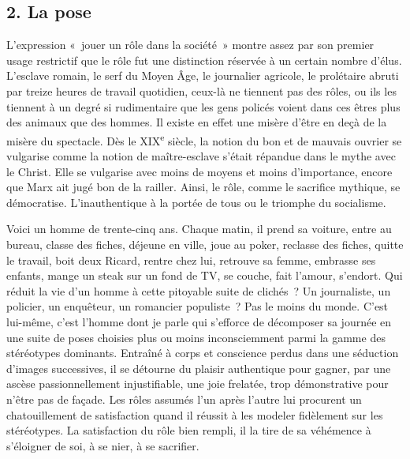 \documentclass[french,twoside]{book} %
\begin{document}
\subsection[{2. La pose}]{\textsc{2.} La pose}
\noindent L’expression « jouer un rôle dans la société » montre assez par son premier usage restrictif que le rôle fut une distinction réservée à un certain nombre d’élus. L’esclave romain, le serf du Moyen Âge, le journalier agricole, le prolétaire abruti par treize heures de travail quotidien, ceux-là ne tiennent pas des rôles, ou ils les tiennent à un degré si rudimentaire que les gens policés voient dans ces êtres plus des animaux que des hommes. Il existe en effet une misère d’être en deçà de la misère du spectacle. Dès le XIX\textsuperscript{e} siècle, la notion du bon et de mauvais ouvrier se vulgarise comme la notion de maître-esclave s’était répandue dans le mythe avec le Christ. Elle se vulgarise avec moins de moyens et moins d’importance, encore que Marx ait jugé bon de la railler. Ainsi, le rôle, comme le sacrifice mythique, se démocratise. L’inauthentique à la portée de tous ou le triomphe du socialisme.\par
Voici un homme de trente-cinq ans. Chaque matin, il prend sa voiture, entre au bureau, classe des fiches, déjeune en ville, joue au poker, reclasse des fiches, quitte le travail, boit deux Ricard, rentre chez lui, retrouve sa femme, embrasse ses enfants, mange un steak sur un fond de TV, se couche, fait l’amour, s’endort. Qui réduit la vie d’un homme à cette pitoyable suite de clichés ? Un journaliste, un policier, un enquêteur, un romancier populiste ? Pas le moins du monde. C’est lui-même, c’est l’homme dont je parle qui s’efforce de décomposer sa journée en une suite de poses choisies plus ou moins inconsciemment parmi la gamme des stéréotypes dominants. Entraîné à corps et conscience perdus dans une séduction d’images successives, il se détourne du plaisir authentique pour gagner, par une ascèse passionnellement injustifiable, une joie frelatée, trop démonstrative pour n’être pas de façade. Les rôles assumés l’un après l’autre lui procurent un chatouillement de satisfaction quand il réussit à les modeler fidèlement sur les stéréotypes. La satisfaction du rôle bien rempli, il la tire de sa véhémence à s’éloigner de soi, à se nier, à se sacrifier.\par
\end{document}
